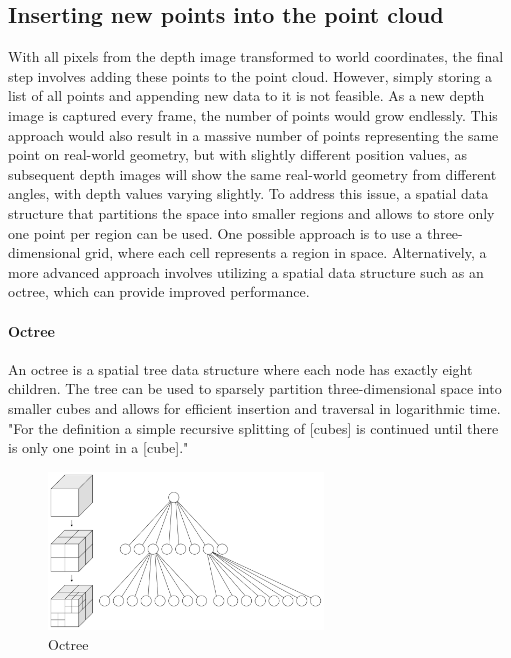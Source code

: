 \subsection{Inserting new points into the point cloud}

With all pixels from the depth image transformed to world coordinates, the final step involves adding these points to the point cloud.
However, simply storing a list of all points and appending new data to it is not feasible.
As a new depth image is captured every frame, the number of points would grow endlessly.
This approach would also result in a massive number of points representing the same point on real-world geometry,
but with slightly different position values,
as subsequent depth images will show the same real-world geometry from different angles, with depth values varying slightly.
To address this issue, a spatial data structure that partitions the space into smaller regions and
allows to store only one point per region can be used.
One possible approach is to use a three-dimensional grid, where each cell represents a region in space.
Alternatively, a more advanced approach involves utilizing a spatial data structure such as an octree,
which can provide improved performance.

\paragraph{Octree}
An octree is a spatial tree data structure where each node has exactly eight children.
The tree can be used to sparsely partition three-dimensional space into smaller cubes and allows for efficient
insertion and traversal in logarithmic time.
"For the definition a simple recursive splitting of [cubes] is continued until there is only one point in a [cube]."
\parencite{gabriel_zachmann_geometric_2002}

\begin{figure}[h]
    \centering
    \includegraphics[width=0.65\textwidth]{images/octree}
    \caption{Octree}
    \label{fig:octrree}
\end{figure}

